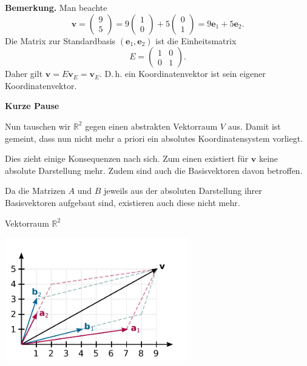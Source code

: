 \documentclass{beamer}
\newcommand{\bv}[1]{\mathbf{#1}}
\newcommand{\R}{\mathbb R}
\newcommand{\strong}[1]{\textsf{\textbf{#1}}}
\begin{document}
\begin{frame}
\strong{Bemerkung.} Man beachte
\[\bv v = \begin{pmatrix}9\\ 5\end{pmatrix} = 
9\begin{pmatrix}1\\ 0\end{pmatrix} + 5\begin{pmatrix}0\\ 1\end{pmatrix}
= 9\bv e_1 + 5\bv e_2.\]\pause
Die Matrix zur Standardbasis $(\bv e_1,\bv e_2)$
ist die Einheitsmatrix
\[E=\begin{pmatrix}1 & 0\\ 0 & 1\end{pmatrix}.
\]\pause
Daher gilt $\bv v = E\bv v_E = \bv v_E$. D.\,h. ein Koordinatenvektor
ist sein eigener Koordinatenvektor. 
\end{frame}

\begin{frame}
\begin{center}
\strong{Kurze Pause}
\end{center}
\end{frame}

\begin{frame}
Nun tauschen wir $\R^2$ gegen einen abstrakten Vektorraum $V$ aus.
Damit ist gemeint, dass nun nicht mehr a priori ein absolutes
Koordinatensystem vorliegt.\pause

\vspace{0.8em}
Dies zieht einige Konsequenzen nach sich. Zum einen existiert für
$\bv v$ keine absolute Darstellung mehr. Zudem sind auch die
Basisvektoren davon betroffen.\pause

\vspace{0.8em}
Da die Matrizen $A$ und $B$ jeweils aus der absoluten Darstellung
ihrer Basisvektoren aufgebaut sind, existieren auch diese nicht mehr.
\end{frame}

\begin{frame}
\begin{center}Vektorraum $\R^2$\end{center}

\vspace{-2em}
\begin{center}
\includegraphics[width=80mm]{img/Vektor-in-Basis-BA.pdf}
\end{center}
\end{frame}
\end{document}
